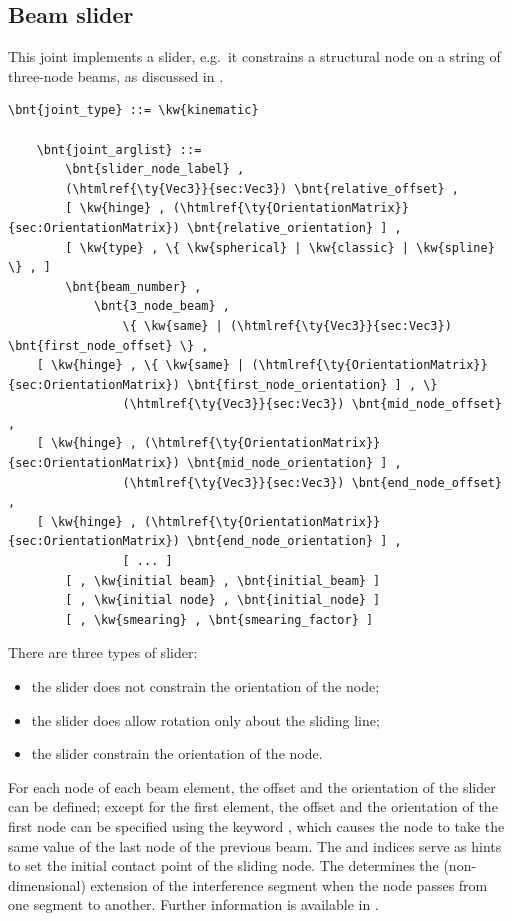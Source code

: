 \subsection{Beam slider}
This joint implements a slider, e.g.\ it constrains a structural node 
on a string of three-node beams, as discussed in \cite{SLIDER-AIDAA-2003}.
\begin{Verbatim}[commandchars=\\\{\}]
    \bnt{joint_type} ::= \kw{kinematic}

    \bnt{joint_arglist} ::=
        \bnt{slider_node_label} ,
        (\htmlref{\ty{Vec3}}{sec:Vec3}) \bnt{relative_offset} ,
        [ \kw{hinge} , (\htmlref{\ty{OrientationMatrix}}{sec:OrientationMatrix}) \bnt{relative_orientation} ] ,
        [ \kw{type} , \{ \kw{spherical} | \kw{classic} | \kw{spline} \} , ]
        \bnt{beam_number} ,
            \bnt{3_node_beam} ,
                \{ \kw{same} | (\htmlref{\ty{Vec3}}{sec:Vec3}) \bnt{first_node_offset} \} ,
    [ \kw{hinge} , \{ \kw{same} | (\htmlref{\ty{OrientationMatrix}}{sec:OrientationMatrix}) \bnt{first_node_orientation} ] , \}
                (\htmlref{\ty{Vec3}}{sec:Vec3}) \bnt{mid_node_offset} ,
    [ \kw{hinge} , (\htmlref{\ty{OrientationMatrix}}{sec:OrientationMatrix}) \bnt{mid_node_orientation} ] ,
                (\htmlref{\ty{Vec3}}{sec:Vec3}) \bnt{end_node_offset} ,
    [ \kw{hinge} , (\htmlref{\ty{OrientationMatrix}}{sec:OrientationMatrix}) \bnt{end_node_orientation} ] ,
                [ ... ]
        [ , \kw{initial beam} , \bnt{initial_beam} ]
        [ , \kw{initial node} , \bnt{initial_node} ]
        [ , \kw{smearing} , \bnt{smearing_factor} ]
\end{Verbatim}
There are three types of slider:
\begin{itemize}
	\item the  slider does not constrain
	the orientation of the node;
	\item the  slider does allow rotation
	only about the sliding line;
	\item the  slider constrain the orientation
	of the node.
\end{itemize}
For each node of each beam element, the offset and the orientation
of the slider can be defined; except for the first element, the
offset and the orientation of the first node can be specified using
the keyword , which causes the node to take the same
value of the last node of the previous beam.
The  and  indices
serve as hints to set the initial contact point of the sliding node.
The  determines the (non-dimensional) extension
of the interference segment when the node passes from one segment
to another.
Further information is available in \cite{SLIDER-AIDAA-2003}.



